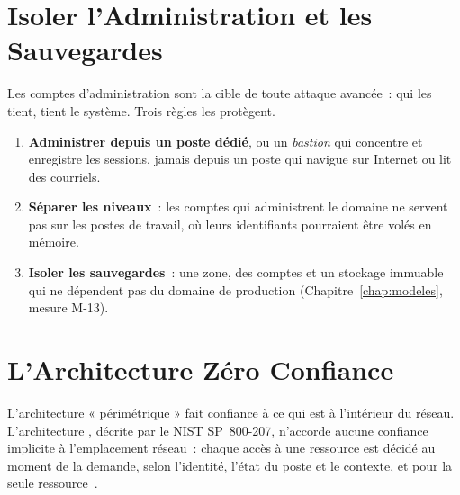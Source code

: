 \section{Isoler l'Administration et les Sauvegardes}
\label{sec:c14-admin}

Les comptes d'administration sont la cible de toute attaque avancée~:
qui les tient, tient le système. Trois règles les protègent.

\begin{enumerate}
    \item \textbf{Administrer depuis un poste dédié}, ou un \emph{bastion}
          qui concentre et enregistre les sessions, jamais depuis un poste
          qui navigue sur Internet ou lit des courriels.
    \item \textbf{Séparer les niveaux}~: les comptes qui administrent le
          domaine ne servent pas sur les postes de travail, où leurs
          identifiants pourraient être volés en mémoire.
    \item \textbf{Isoler les sauvegardes}~: une zone, des comptes et un
          stockage immuable qui ne dépendent pas du domaine de production
          (Chapitre~\ref{chap:modeles}, mesure M-13).
\end{enumerate}

\section{L'Architecture Zéro Confiance}
\label{sec:c14-zt}

L'architecture « périmétrique » fait confiance à ce qui est à l'intérieur
du réseau. L'architecture , décrite par le NIST
SP~800-207, n'accorde aucune confiance implicite à l'emplacement réseau~:
chaque accès à une ressource est décidé au moment de la demande, selon
l'identité, l'état du poste et le contexte, et pour la seule
ressource~\cite{nist800207}.

